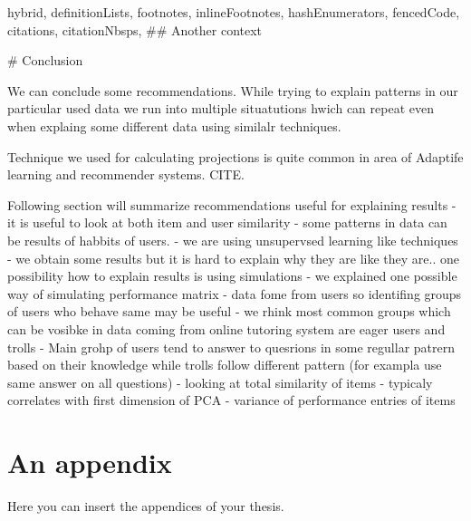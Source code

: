 \documentclass[
  digital, %
  table,   %
  nolof,     %
  nolot,     %
  nocover
]{fithesis3}
\begin{document}
\begin{markdown*}{%
  hybrid,
  definitionLists,
  footnotes,
  inlineFootnotes,
  hashEnumerators,
  fencedCode,
  citations,
  citationNbsps,
}
## Another context


# Conclusion


We can conclude some recommendations. While trying to explain patterns in our particular used data we run into multiple situatutions hwich can repeat even when explaing some different data using similalr techniques.

Technique we used for calculating projections is quite common in area of Adaptife learning and recommender systems. CITE.

Following section will summarize recommendations useful for explaining results
- it is useful to look at both item and user similarity
- some patterns in data can be results of habbits of users.
  - we are using unsupervsed learning like techniques - we obtain some results but it is hard to explain why they are like they are.. one possibility how to explain results is using simulations
  - we explained one possible way of simulating performance matrix
- data fome from users so identifing groups of users who behave same may be useful
  - we rhink most common  groups which can be vosibke in data coming from online tutoring system are eager users and trolls
    - Main grohp of users tend to answer to quesrions in some regullar patrern based on their knowledge while trolls follow different pattern (for exampla use same answer on all questions)
    - looking at total similarity of items - typicaly correlates with first dimension of PCA
      - variance of performance entries of items

\end{markdown*}

  \makeatletter\thesis@blocks@clear\makeatother
  \printindex

\appendix %
\chapter{An appendix}
Here you can insert the appendices of your thesis.
\end{document}
